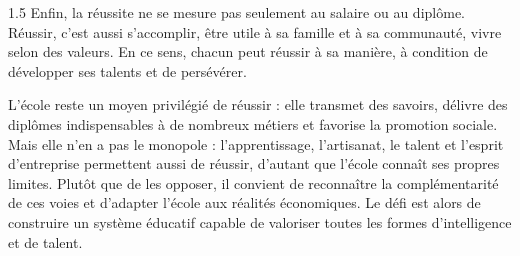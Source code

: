 \documentclass[12pt]{article}
\begin{document}
\begin{spacing}{1.5}
Enfin, la réussite ne se mesure pas seulement au salaire ou au diplôme. Réussir, c'est aussi s'accomplir, être utile à sa famille et à sa communauté, vivre selon des valeurs. En ce sens, chacun peut réussir à sa manière, à condition de développer ses talents et de persévérer.


L'école reste un moyen privilégié de réussir : elle transmet des savoirs, délivre des diplômes indispensables à de nombreux métiers et favorise la promotion sociale. Mais elle n'en a pas le monopole : l'apprentissage, l'artisanat, le talent et l'esprit d'entreprise permettent aussi de réussir, d'autant que l'école connaît ses propres limites. Plutôt que de les opposer, il convient de reconnaître la complémentarité de ces voies et d'adapter l'école aux réalités économiques. Le défi est alors de construire un système éducatif capable de valoriser toutes les formes d'intelligence et de talent.

\end{spacing}
\end{document}
